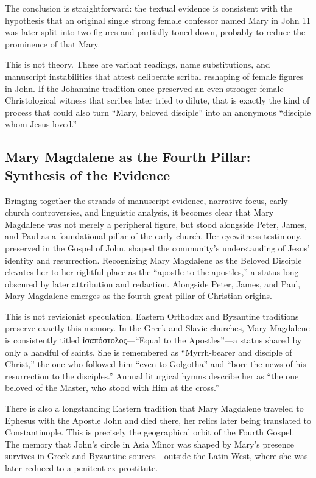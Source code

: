 The conclusion is straightforward: the textual evidence is consistent with the hypothesis that an original single strong female confessor named Mary in John 11 was later split into two figures and partially toned down, probably to reduce the prominence of that Mary.

This is not theory.
These are variant readings, name substitutions, and manuscript instabilities that attest deliberate scribal reshaping of female figures in John.
If the Johannine tradition once preserved an even stronger female Christological witness that scribes later tried to dilute, that is exactly the kind of process that could also turn ``Mary, beloved disciple'' into an anonymous ``disciple whom Jesus loved.''

\subsection{Mary Magdalene as the Fourth Pillar: Synthesis of the Evidence}\label{subsec:mary-magdalene-as-the-fourth-pillar-synthesis}

Bringing together the strands of manuscript evidence, narrative focus, early church controversies, and linguistic analysis, it becomes clear that Mary Magdalene was not merely a peripheral figure, but stood alongside Peter, James, and Paul as a foundational pillar of the early church. Her eyewitness testimony, preserved in the Gospel of John, shaped the community's understanding of Jesus' identity and resurrection. Recognizing Mary Magdalene as the Beloved Disciple elevates her to her rightful place as the ``apostle to the apostles,'' a status long obscured by later attribution and redaction. Alongside Peter, James, and Paul, Mary Magdalene emerges as the fourth great pillar of Christian origins.

This is not revisionist speculation.
Eastern Orthodox and Byzantine traditions preserve exactly this memory.
In the Greek and Slavic churches, Mary Magdalene is consistently titled ἰσαπόστολος---``Equal to the Apostles''---a status shared by only a handful of saints.
She is remembered as ``Myrrh-bearer and disciple of Christ,'' the one who followed him ``even to Golgotha'' and ``bore the news of his resurrection to the disciples.''
Annual liturgical hymns describe her as ``the one beloved of the Master, who stood with Him at the cross.''

There is also a longstanding Eastern tradition that Mary Magdalene traveled to Ephesus with the Apostle John and died there, her relics later being translated to Constantinople.
This is precisely the geographical orbit of the Fourth Gospel.
The memory that John's circle in Asia Minor was shaped by Mary's presence survives in Greek and Byzantine sources---outside the Latin West, where she was later reduced to a penitent ex-prostitute.

